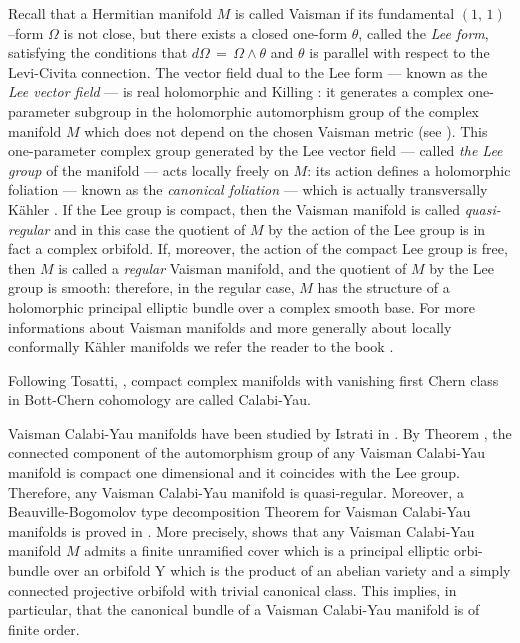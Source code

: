 \documentclass[12pt,reqno]{amsart}
\theoremstyle{definition}
\numberwithin{equation}{section}
\begin{document}
Recall that a Hermitian manifold $M$ is called Vaisman if its fundamental $(1,\,1)$--form $\Omega$ is not 
close, but there exists a closed one-form $\theta$, called the {\it Lee form}, satisfying the conditions 
that $d\Omega\,=\, \Omega \wedge \theta$ and $\theta$ is parallel with respect to the Levi-Civita 
connection. The vector field dual to the Lee form --- known as the {\it Lee vector field} --- is real 
holomorphic and Killing \cite{Va2}: it generates a complex one-parameter subgroup in the holomorphic 
automorphism group of the complex manifold $M$ which does not depend on the chosen Vaisman metric (see 
\cite{Ts}). This one-parameter complex group generated by the Lee vector field --- called {\it the Lee 
group} of the manifold --- acts locally freely on $M$: its action defines a holomorphic foliation --- known 
as the {\it canonical foliation} --- which is actually transversally K\"ahler \cite{Va2}. If the Lee group is 
compact, then the Vaisman manifold is called {\it quasi-regular} and in this case the quotient of $M$ by 
the action of the Lee group is in fact a complex orbifold. If, moreover, the action of the compact Lee group is 
free, then $M$ is called a {\it regular} Vaisman manifold, and the quotient of $M$ by the Lee group is 
smooth: therefore, in the regular case, $M$ has the structure of a holomorphic principal elliptic bundle 
over a complex smooth base. For more informations about Vaisman manifolds and more generally about locally conformally K\"ahler manifolds we refer the reader to the book \cite{OV}.

Following Tosatti, \cite{To}, compact complex manifolds with vanishing first Chern class in 
Bott-Chern cohomology are called Calabi-Yau.

Vaisman Calabi-Yau manifolds have been studied by Istrati in \cite{Is}. By Theorem \cite[Theorem C]{Is}, the 
connected component of the automorphism group of any Vaisman Calabi-Yau manifold is compact one dimensional and it
coincides with the Lee group. Therefore, any Vaisman Calabi-Yau manifold is quasi-regular. Moreover, a 
Beauville-Bogomolov type decomposition Theorem for Vaisman Calabi-Yau manifolds is proved in \cite[Theorem 
D]{Is}. More precisely, \cite[Theorem D]{Is} shows that any Vaisman Calabi-Yau manifold $M$ admits a finite 
unramified cover which is a principal elliptic orbi-bundle over an orbifold Y which is the product of an 
abelian variety and a simply connected projective orbifold with trivial canonical class. This implies, in 
particular, that the canonical bundle of a Vaisman Calabi-Yau manifold is of finite order.
 
\end{document}
